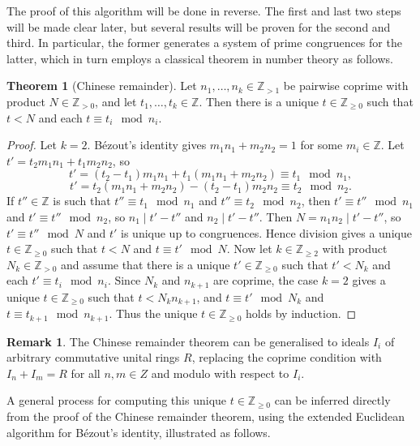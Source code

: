\documentclass{article}
\newcommand{\Z}{\mathbb{Z}}
\newcommand{\rb}[1]{\left( #1 \right)}
\theoremstyle{definition}\newtheorem*{definition}{Definition}
\theoremstyle{definition}\newtheorem*{example}{Example}
\theoremstyle{definition}\newtheorem*{remark}{Remark}
\newtheorem{theorem}[proposition]{Theorem}
\begin{document}
The proof of this algorithm will be done in reverse. The first and last two steps will be made clear later, but several results will be proven for the second and third. In particular, the former generates a system of prime congruences for the latter, which in turn employs a classical theorem in number theory as follows.

\begin{theorem}[Chinese remainder]
Let $ n_1, \dots, n_k \in \Z_{> 1} $ be pairwise coprime with product $ N \in \Z_{> 0} $, and let $ t_1, \dots, t_k \in \Z $. Then there is a unique $ t \in \Z_{\ge 0} $ such that $ t < N $ and each $ t \equiv t_i \mod n_i $.
\end{theorem}

\begin{proof}
Let $ k = 2 $. Bézout's identity gives $ m_1n_1 + m_2n_2 = 1 $ for some $ m_i \in \Z $. Let $ t' = t_2m_1n_1 + t_1m_2n_2 $, so
$$ t' = \rb{t_2 - t_1}m_1n_1 + t_1\rb{m_1n_1 + m_2n_2} \equiv t_1 \mod n_1, $$
$$ t' = t_2\rb{m_1n_1 + m_2n_2} - \rb{t_2 - t_1}m_2n_2 \equiv t_2 \mod n_2. $$
If $ t'' \in \Z $ is such that $ t'' \equiv t_1 \mod n_1 $ and $ t'' \equiv t_2 \mod n_2 $, then $ t' \equiv t'' \mod n_1 $ and $ t' \equiv t'' \mod n_2 $, so $ n_1 \mid t' - t'' $ and $ n_2 \mid t' - t'' $. Then $ N = n_1n_2 \mid t' - t'' $, so $ t' \equiv t'' \mod N $ and $ t' $ is unique up to congruences. Hence division gives a unique $ t \in \Z_{\ge 0} $ such that $ t < N $ and $ t \equiv t' \mod N $. Now let $ k \in \Z_{\ge 2} $ with product $ N_k \in \Z_{> 0} $ and assume that there is a unique $ t' \in \Z_{\ge 0} $ such that $ t' < N_k $ and each $ t' \equiv t_i \mod n_i $. Since $ N_k $ and $ n_{k + 1} $ are coprime, the case $ k = 2 $ gives a unique $ t \in \Z_{\ge 0} $ such that $ t < N_kn_{k + 1} $, and $ t \equiv t' \mod N_k $ and $ t \equiv t_{k + 1} \mod n_{k + 1} $. Thus the unique $ t \in \Z_{\ge 0} $ holds by induction.
\end{proof}

\begin{remark}
The Chinese remainder theorem can be generalised to ideals $ I_i $ of arbitrary commutative unital rings $ R $, replacing the coprime condition with $ I_n + I_m = R $ for all $ n, m \in Z $ and modulo with respect to $ I_i $.
\end{remark}

A general process for computing this unique $ t \in \Z_{\ge 0} $ can be inferred directly from the proof of the Chinese remainder theorem, using the extended Euclidean algorithm for Bézout's identity, illustrated as follows.
\end{document}
